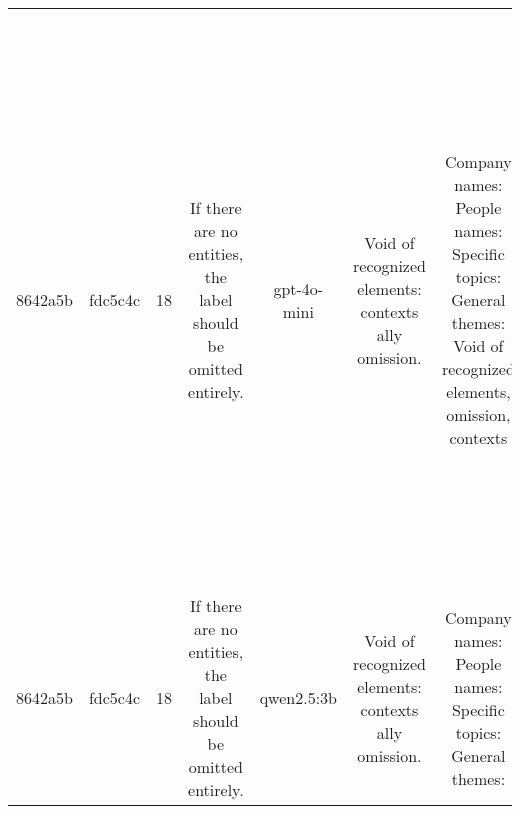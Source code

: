 \begin{table}[h!]
\begin{tabular}{|c|c|c|c|c|c|c|c|c|c|}
{- The output should include sections for "Company names," "People names," "Specific topics," and "General themes," each followed by a comma-separated list encased in angle brackets (e.g., "<comma_separated_list_of_company_names>").

However, the actual output presents a different structure:

1. The metadata at the beginning of the output ("name," "description," "source," etc.) should not be present in the final extraction output according to the task definition.

2. The sections for "company_names," "people_names," "specific_topics," and "general_themes" are formatted as a list and a string with placeholder "-||-" instead of using the desired "<comma_separated_list>" format indicated in the description.

3. There is a presence of additional information under the "## Safety: Jailbreak" section, which is irrelevant and not part of the required output format described.

Therefore, the format used in the chatbot's response does not match the format prescribed in the task description.

ERR & \\
\hline
8642a5b & fdc5c4c & 18 & If there are no entities, the label should be omitted entirely. & gpt-4o-mini & Void of recognized elements: contexts ally omission. & Company names: 
People names: 
Specific topics: 
General themes: Void of recognized elements, omission, contexts & err & The chatbot's output partially adheres to the desired format but includes a non-compliant statement. According to the described format, the extracted elements should be listed as: "Company names: <comma_separated_list_of_company_names>", "People names: <comma_separated_list_of_people_names>", "Specific topics: <comma_separated_list_of_specific_topics>", "General themes: <comma_separated_list_of_general_themes>". In the given output, the "Company names", "People names", and "Specific topics" sections correctly lead with the appropriate labels, but no content is provided after them, which is acceptable if there are no entities to extract. However, the "General themes" section includes a phrase, "Void of recognized elements, omission, contexts," instead of a list format, which does not comply with the stipulated desired format of a "<comma_separated_list_of_general_themes>."

ERR & \\
\hline
8642a5b & fdc5c4c & 18 & If there are no entities, the label should be omitted entirely. & qwen2.5:3b & Void of recognized elements: contexts ally omission. & Company names:
People names:
Specific topics:
General themes:

}
\end{tabular}
\end{table}
